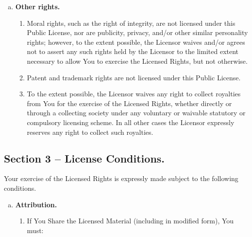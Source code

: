 {\begin{enumerate}[a.]
\begin{enumerate}[1.]
\begin{enumerate}[A.]
\end{enumerate}
\item \underline{No endorsement}. Nothing in this Public License constitutes or may be construed as permission to assert or imply that You are, or that Your use of the Licensed Material is, connected with, or sponsored, endorsed, or granted official status by, the Licensor or others designated to receive attribution as provided in Section 3(a)(1)(A)(i).
\end{enumerate}

\item \textbf{Other rights.}

\begin{enumerate}[1.]
\item Moral rights, such as the right of integrity, are not licensed under this Public License, nor are publicity, privacy, and/or other similar personality rights; however, to the extent possible, the Licensor waives and/or agrees not to assert any such rights held by the Licensor to the limited extent necessary to allow You to exercise the Licensed Rights, but not otherwise.
\item Patent and trademark rights are not licensed under this Public License.
\item To the extent possible, the Licensor waives any right to collect royalties from You for the exercise of the Licensed Rights, whether directly or through a collecting society under any voluntary or waivable statutory or compulsory licensing scheme. In all other cases the Licensor expressly reserves any right to collect such royalties.
\end{enumerate}
\end{enumerate}

\subsection*{Section 3 -- License Conditions.}

Your exercise of the Licensed Rights is expressly made subject to the following conditions.

\begin{enumerate}[a.]
\item \textbf{Attribution.}

\begin{enumerate}[1.]
\item If You Share the Licensed Material (including in modified form), You must:


\end{enumerate}
\end{enumerate}}
